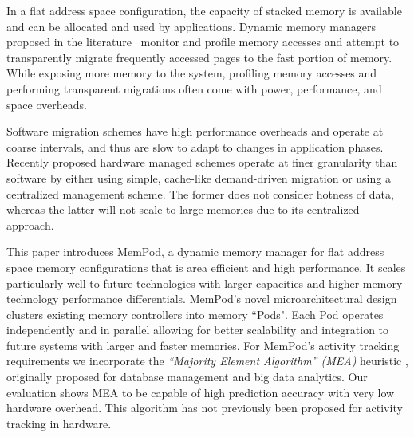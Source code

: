 In a flat address space configuration, the capacity of stacked memory is 
available and can be allocated and used by applications. Dynamic memory 
managers proposed in the literature~\cite{sim-micro2014,meswani-HPCA21,cameo} 
monitor and profile memory accesses and attempt to transparently migrate 
frequently accessed pages to the fast portion of memory. While exposing
more memory to the system, profiling memory accesses and performing 
transparent migrations often come with power, performance, and space overheads. 



Software migration schemes \cite{meswani-HPCA21} have high performance 
overheads and operate at coarse intervals, and thus are slow to adapt to 
changes in application phases. Recently proposed hardware managed schemes \cite{sim-micro2014,cameo} operate at finer granularity than software by either using simple, cache-like demand-driven migration or using a centralized management scheme. The former does not consider hotness of data, whereas the latter will not scale to large memories due to its centralized approach.

This paper introduces MemPod, a dynamic memory manager for flat address space memory configurations that is area efficient and high performance.
It scales particularly well to future technologies with larger capacities and
higher memory technology performance differentials. 
MemPod's novel microarchitectural design clusters existing memory controllers into memory ``Pods". Each Pod operates independently and in parallel allowing for better scalability and integration to future systems with larger and faster memories. For MemPod's activity tracking requirements we incorporate the \emph{``Majority Element Algorithm'' (MEA)} heuristic \cite{karp-mea,charikar-mea}, originally proposed for database management and big data analytics. Our evaluation shows MEA to be capable of high prediction accuracy with very low hardware overhead. This algorithm has 
not previously been proposed for activity tracking in hardware.

